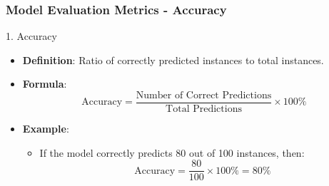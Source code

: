 \documentclass[aspectratio=169]{beamer}
\begin{document}
\begin{frame}[fragile]
    \frametitle{Model Evaluation Metrics - Accuracy}
    \begin{block}{1. Accuracy}
        \begin{itemize}
            \item \textbf{Definition}: Ratio of correctly predicted instances to total instances.
            \item \textbf{Formula}:
            \[
            \text{Accuracy} = \frac{\text{Number of Correct Predictions}}{\text{Total Predictions}} \times 100\%
            \]
            \item \textbf{Example}:
            \begin{itemize}
                \item If the model correctly predicts 80 out of 100 instances, then:
                \[
                \text{Accuracy} = \frac{80}{100} \times 100\% = 80\%
                \]
            \end{itemize}
        \end{itemize}
    \end{block}
\end{frame}
\end{document}
